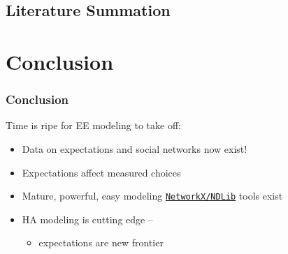 \documentclass[pdflatex]{beamer}
\begin{document}
\subsection{Literature Summation}

\section{Conclusion}
\begin{frame}
	\frametitle{Conclusion}

Time is ripe for EE modeling to take off:
\begin{itemize}
    \item Data on expectations and social networks now exist!
    \item Expectations affect measured choices
    \item Mature, powerful, easy modeling \href{https://https://ndlib.readthedocs.io/en/latest/}{\texttt{NetworkX/NDLib}} tools exist
    \item HA modeling is cutting edge --
    \begin{itemize}
        \item     expectations are new frontier
    \end{itemize}
\end{itemize}

\end{frame}



\def\newblock{\hskip .11em plus .33em minus .07em}

\begin{frame}
\renewcommand{\bibsection}{\subsubsection*{\bibname }}
\tiny


%

\end{frame}
\end{document}
